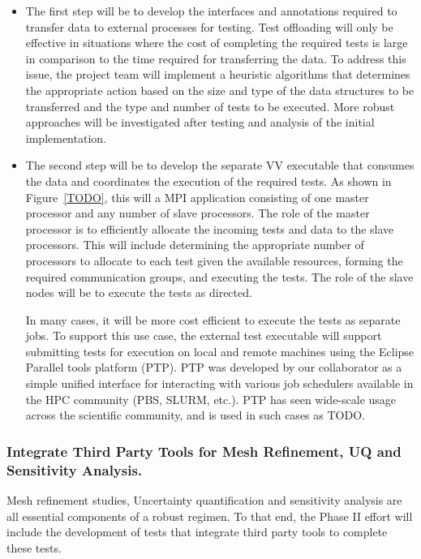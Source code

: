 \begin{itemize}
 \item The first step will be to develop the interfaces and annotations required to transfer data to external processes for testing. Test offloading will only be effective in situations where the cost of completing the required tests is large in comparison to the time required for transferring the data. To address this issue, the project team will implement a heuristic algorithms that determines the appropriate action based on the size and type of the data structures to be transferred and the type and number of tests to be executed. More robust approaches will be investigated after testing and analysis of the initial implementation.  
 \item The second step will be to develop the separate VV executable that consumes the data and coordinates the execution of the required tests. As shown in Figure~\ref{TODO}, this will a MPI application consisting of one master processor and any number of slave processors. The role of the master processor is to efficiently allocate the incoming tests and data to the slave processors. This will include determining the appropriate number of processors to allocate to each test given the available resources, forming the required communication groups, and executing the tests. The role of the slave nodes will be to execute the tests as directed. 
 
 In many cases, it will be more cost efficient to execute the tests as separate jobs. To support this use case, the external test executable will support submitting tests for execution on local and remote machines using the Eclipse Parallel tools platform (PTP). PTP was developed by our collaborator as a simple unified interface for interacting with various job schedulers available in the HPC community (PBS, SLURM, etc.). PTP has seen wide-scale usage across the scientific community, and is used in such cases as TODO.
 \end{itemize}


\subsubsection{Integrate Third Party Tools for Mesh Refinement, UQ and Sensitivity Analysis.}

Mesh refinement studies, Uncertainty quantification and sensitivity analysis are all essential components of a robust \VV regimen. To that
end, the Phase II effort will include the development of \VV tests that integrate third party tools to complete these tests. 

